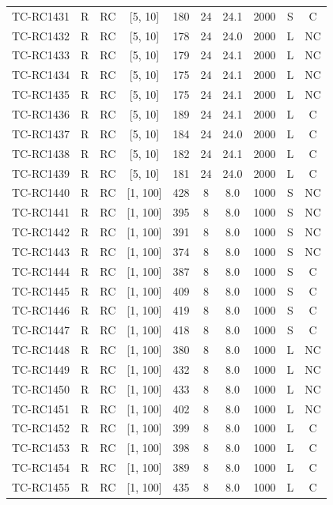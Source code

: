 \begin{longtable}{lccccccccc}
TC-RC1431 & R & RC & [5, 10] & 180 & 24 & 24.1 & 2000 & S & C \\
TC-RC1432 & R & RC & [5, 10] & 178 & 24 & 24.0 & 2000 & L & NC \\
TC-RC1433 & R & RC & [5, 10] & 179 & 24 & 24.1 & 2000 & L & NC \\
TC-RC1434 & R & RC & [5, 10] & 175 & 24 & 24.1 & 2000 & L & NC \\
TC-RC1435 & R & RC & [5, 10] & 175 & 24 & 24.1 & 2000 & L & NC \\
TC-RC1436 & R & RC & [5, 10] & 189 & 24 & 24.1 & 2000 & L & C \\
TC-RC1437 & R & RC & [5, 10] & 184 & 24 & 24.0 & 2000 & L & C \\
TC-RC1438 & R & RC & [5, 10] & 182 & 24 & 24.1 & 2000 & L & C \\
TC-RC1439 & R & RC & [5, 10] & 181 & 24 & 24.0 & 2000 & L & C \\
TC-RC1440 & R & RC & [1, 100] & 428 & 8 & 8.0 & 1000 & S & NC \\
TC-RC1441 & R & RC & [1, 100] & 395 & 8 & 8.0 & 1000 & S & NC \\
TC-RC1442 & R & RC & [1, 100] & 391 & 8 & 8.0 & 1000 & S & NC \\
TC-RC1443 & R & RC & [1, 100] & 374 & 8 & 8.0 & 1000 & S & NC \\
TC-RC1444 & R & RC & [1, 100] & 387 & 8 & 8.0 & 1000 & S & C \\
TC-RC1445 & R & RC & [1, 100] & 409 & 8 & 8.0 & 1000 & S & C \\
TC-RC1446 & R & RC & [1, 100] & 419 & 8 & 8.0 & 1000 & S & C \\
TC-RC1447 & R & RC & [1, 100] & 418 & 8 & 8.0 & 1000 & S & C \\
TC-RC1448 & R & RC & [1, 100] & 380 & 8 & 8.0 & 1000 & L & NC \\
TC-RC1449 & R & RC & [1, 100] & 432 & 8 & 8.0 & 1000 & L & NC \\
TC-RC1450 & R & RC & [1, 100] & 433 & 8 & 8.0 & 1000 & L & NC \\
TC-RC1451 & R & RC & [1, 100] & 402 & 8 & 8.0 & 1000 & L & NC \\
TC-RC1452 & R & RC & [1, 100] & 399 & 8 & 8.0 & 1000 & L & C \\
TC-RC1453 & R & RC & [1, 100] & 398 & 8 & 8.0 & 1000 & L & C \\
TC-RC1454 & R & RC & [1, 100] & 389 & 8 & 8.0 & 1000 & L & C \\
TC-RC1455 & R & RC & [1, 100] & 435 & 8 & 8.0 & 1000 & L & C \\

\end{longtable}
